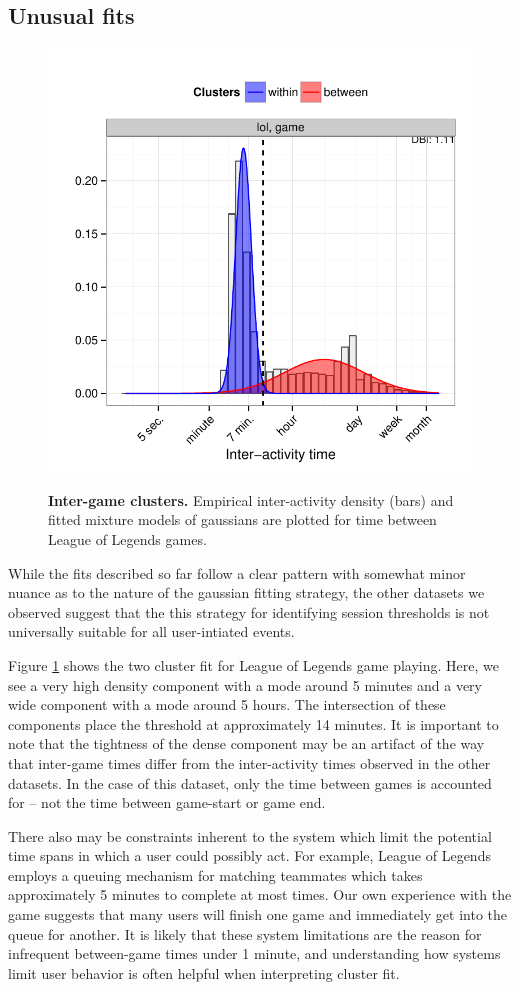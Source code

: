 \subsection{Unusual fits}
\begin{figure}
\centering
\includegraphics[width=.45\textwidth]{figures/weird_lol_clusters.pdf}
\label{fig:lol_game_clusters}
\caption{
    \textbf{Inter-game clusters.} Empirical inter-activity density (bars) and fitted mixture models of gaussians are plotted for time between League of Legends games.
}
\end{figure}
While the fits described so far follow a clear pattern with somewhat minor nuance as to the nature of the gaussian fitting strategy, the other datasets we observed suggest that the this strategy for identifying session thresholds is not universally suitable for all user-intiated events.

Figure \ref{fig:lol_game_clusters} shows the two cluster fit for League of Legends game playing.  Here, we see a very high density component with a mode around 5 minutes and a very wide component with a mode around 5 hours.  The intersection of these components place the threshold at approximately 14 minutes.  It is important to note that the tightness of the dense component may be an artifact of the way that inter-game times differ from the inter-activity times observed in the other datasets.  In the case of this dataset, only the time between games is accounted for -- not the time between game-start or game end.

There also may be constraints inherent to the system which limit the potential time spans in which a user could possibly act.  For example, League of Legends employs a queuing mechanism for matching teammates which takes approximately 5 minutes to complete at most times.  Our own experience with the game suggests that many users will finish one game and immediately get into the queue for another.  It is likely that these system limitations are the reason for infrequent between-game times under 1 minute, and understanding how systems limit user behavior is often helpful when interpreting cluster fit.


